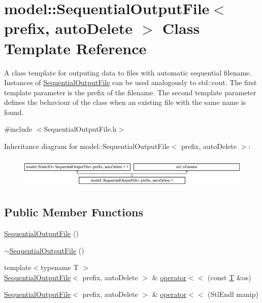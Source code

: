 \hypertarget{classmodel_1_1_sequential_output_file}{}\section{model\+:\+:Sequential\+Output\+File$<$ prefix, auto\+Delete $>$ Class Template Reference}
\label{classmodel_1_1_sequential_output_file}


A class template for outputing data to files with automatic sequential filename. Instances of \hyperlink{classmodel_1_1_sequential_output_file}{Sequential\+Output\+File} can be used analogously to std\+::cout. The first template parameter is the prefix of the filename. The second template parameter defines the behaviour of the class when an existing file with the same name is found.  




{\ttfamily \#include $<$Sequential\+Output\+File.\+h$>$}

Inheritance diagram for model\+:\+:Sequential\+Output\+File$<$ prefix, auto\+Delete $>$\+:\begin{figure}[H]
\begin{center}
\leavevmode
\includegraphics[height=1.525886cm]{classmodel_1_1_sequential_output_file}
\end{center}
\end{figure}
\subsection*{Public Member Functions}
\begin{DoxyCompactItemize}
\item 
\hyperlink{classmodel_1_1_sequential_output_file_a8651667048be5503b86f6fe362c90bf6}{Sequential\+Output\+File} ()
\item 
\hyperlink{classmodel_1_1_sequential_output_file_a433d6af912c83293886e333e3e74537a}{$\sim$\+Sequential\+Output\+File} ()
\item 
{\footnotesize template$<$typename T $>$ }\\\hyperlink{classmodel_1_1_sequential_output_file}{Sequential\+Output\+File}$<$ prefix, auto\+Delete $>$ \& \hyperlink{classmodel_1_1_sequential_output_file_aa22e527a9a43d8692c125895bbc7a5b5}{operator$<$$<$} (const \hyperlink{_spline_node_base__corder1_8h_a82692d3a5502b91460591f1d5504314a}{T} \&os)
\item 
\hyperlink{classmodel_1_1_sequential_output_file}{Sequential\+Output\+File}$<$ prefix, auto\+Delete $>$ \& \hyperlink{classmodel_1_1_sequential_output_file_ab193eb47f7d3d53c836bbb4cecb88e3b}{operator$<$$<$} (Stl\+Endl manip)
\end{DoxyCompactItemize}
